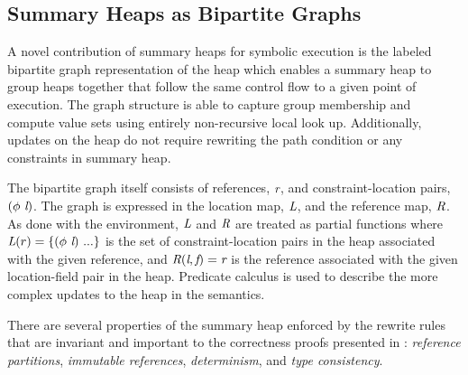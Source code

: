 \subsection{Summary Heaps as Bipartite Graphs}
A novel contribution of summary heaps for symbolic execution is the
labeled bipartite graph representation of the heap which enables a
summary heap to group heaps together that follow the same control flow
to a given point of execution. The graph structure is able to capture
group membership and compute value sets using entirely non-recursive
local look up. Additionally, updates on the heap do not require
rewriting the path condition or any constraints in summary heap.

The bipartite graph itself consists of references, $\emph{r}$, and
constraint-location pairs, $(\phi\ \emph{l})$. The graph is
expressed in the location map, $\emph{L}$, and the reference map,
$\emph{R}$. As done with the environment, $\emph{L}$ and $\emph{R}$
are treated as partial functions where $\emph{L}(r) =
\{(\phi\ \emph{l})\ ...\}$ is the set of constraint-location pairs in
the heap associated with the given reference, and
$\emph{R}(\emph{l},\emph{f}) = \emph{r}$ is the reference
associated with the given location-field pair in the heap. Predicate
calculus is used to describe the more complex updates to the heap in
the semantics.

There are several properties of the summary heap enforced by the
rewrite rules that are invariant and important to the correctness
proofs presented in : \emph{reference partitions},
\emph{immutable references}, \emph{determinism}, and \emph{type
  consistency}.


